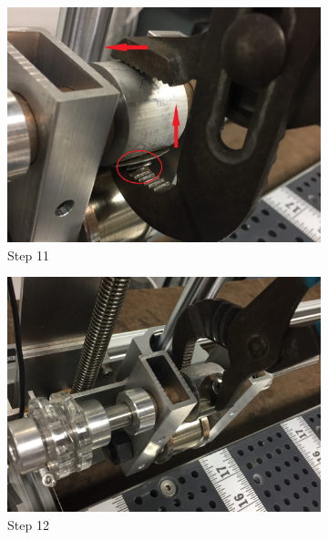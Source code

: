 \documentclass[titlepage,12pt,letter]{report}
\numberwithin{equation}{chapter}
\begin{document}
\begin{enumerate}[itemsep = 5pt,topsep=0pt]
\begin{figure}[H]
\begin{subfigure}[b]{.475\textwidth}
		\includegraphics[width=\textwidth]{./Figures/Wire_mounting/11.jpg}
		\caption{Step 11}
	\end{subfigure}
	\begin{subfigure}[b]{.475\textwidth}
		\centering
		\includegraphics[width=\textwidth]{./Figures/Wire_mounting/12.jpg}
		\caption{Step 12}
	\end{subfigure}	
	\centering
	\begin{subfigure}[b]{.475\textwidth}
		\centering

\end{subfigure}
\end{figure}
\end{enumerate}
\end{document}
